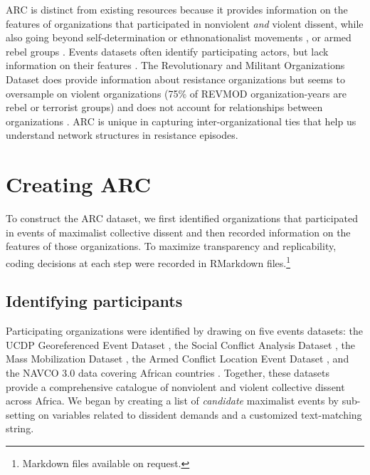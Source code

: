 ARC is distinct from existing resources because it provides information on the
features of organizations that participated in nonviolent \textit{and} violent
dissent, while also going beyond self-determination or ethnonationalist
movements \citep{Wilkenfeld2011, Cunningham2020}, or armed rebel groups
\citep{Pettersson2020a, Harbom2008, Braithwaite2020, Stewart2018,
Cunningham2013, Svensson2018, Cunningham2009a}. Events datasets often identify
participating actors, but lack information on their features
\citep{Chenoweth2018, Chenoweth2019b, Salehyan2012, Clark2021, Raleigh2010,
Chenoweth2019b}. The Revolutionary and Militant Organizations Dataset does
provide information about resistance organizations but seems to oversample on
violent organizations (75\% of REVMOD organization-years are rebel or terrorist
groups) and does not account for relationships between organizations
\citep{Acosta2019}. ARC is unique in capturing inter-organizational ties that
help us understand network structures in resistance episodes. 


\section{Creating ARC}

To construct the ARC dataset, we first identified organizations that
participated in events of maximalist collective dissent and then recorded
information on the features of those organizations. To maximize transparency and
replicability, coding decisions at each step were recorded in RMarkdown
files.\footnote{Markdown files available on request.}

\subsection{Identifying participants}

Participating organizations were identified by drawing on five events datasets:
the UCDP Georeferenced Event Dataset \citep{Sundberg2013}, the Social Conflict
Analysis Dataset \citep{Salehyan2012}, the Mass Mobilization Dataset
\citep{Clark2021}, the Armed Conflict Location Event Dataset
\citep{Raleigh2010}, and the NAVCO 3.0 data covering African countries
\citep{Chenoweth2018}. Together, these datasets provide a comprehensive
catalogue of nonviolent and violent collective dissent across Africa. We began
by creating a list of \emph{candidate} maximalist events by sub-setting on
variables related to dissident demands and a customized text-matching string. 

